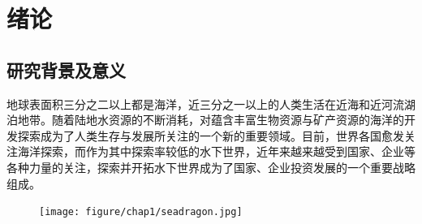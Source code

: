 



\chapter{绪论}
\label{chap:Introduction}
\section{研究背景及意义 }

地球表面积三分之二以上都是海洋，近三分之一以上的人类生活在近海和近河流湖泊地带。随着陆地水资源的不断消耗，对蕴含丰富生物资源与矿产资源的海洋的开发探索成为了人类生存与发展所关注的一个新的重要领域\cite{fossen1994guidance,Fossen2002Marine}。目前，世界各国愈发关注海洋探索，而作为其中探索率较低的水下世界，近年来越来越受到国家、企业等各种力量的关注，探索并开拓水下世界成为了国家、企业投资发展的一个重要战略组成\cite{bottaccini1954stablity,John1978Methods}。

\begin{figure}
\centering
\texttt{[image: figure/chap1/seadragon.jpg]}
\label{fig:chap1:F1}
\end{figure}

